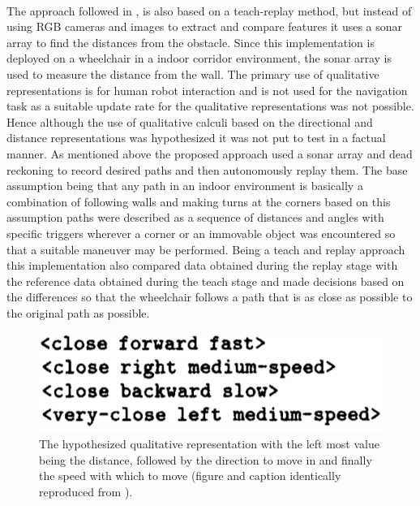 	 \paragraph{}The approach followed in \cite{musto1999qualitative}, is also based on a teach-replay method, but instead of using RGB cameras and images to extract and compare features it uses a sonar array to find the distances from the obstacle. Since this implementation is deployed on a wheelchair in a indoor corridor environment, the sonar array is used to measure the distance from the wall. The primary use of qualitative representations is for human robot interaction and is not used for the navigation task as a suitable update rate for the qualitative representations was not possible. Hence although the use of qualitative calculi based on the directional and distance representations was hypothesized it was not put to test in a factual manner. As mentioned above the proposed approach used a sonar array and dead reckoning to record desired paths and then autonomously replay them. The base assumption being that any path in an indoor environment is basically a combination of following walls and making turns at the corners based on this assumption paths were described as a sequence of distances and angles with specific triggers wherever a corner or an immovable object was encountered so that a suitable maneuver may be performed. Being a teach and replay approach this implementation also compared data obtained during the replay stage with the reference data obtained during the teach stage and made decisions based on the differences so that the wheelchair follows a path that is as close as possible to the original path as possible.
	\begin{figure}[h]
		\centering
		\includegraphics[scale=0.7]{images/musto}
		\caption{The hypothesized qualitative representation with the left most value being the distance, followed by the direction to move in and finally the speed with which to move (figure and caption identically reproduced from \cite{musto1999qualitative}).}
		\label{fig:musto}
	\end{figure}
	
